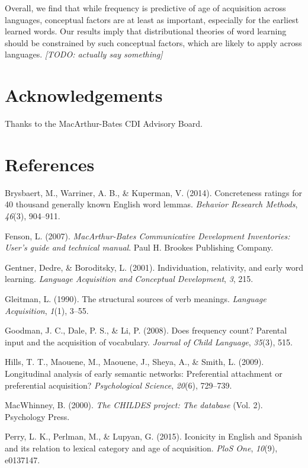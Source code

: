 \documentclass[10pt, letterpaper]{article}
\begin{document}
Overall, we find that while frequency is predictive of age of
acquisition across languages, conceptual factors are at least as
important, especially for the earliest learned words. Our results imply
that distributional theories of word learning should be constrained by
such conceptual factors, which are likely to apply across languages.
\emph{{[}TODO: actually say something{]}}

\section{Acknowledgements}\label{acknowledgements}

Thanks to the MacArthur-Bates CDI Advisory Board.

\section{References}\label{references}

\setlength{\parindent}{-0.1in} \setlength{\leftskip}{0.125in} \noindent

Brysbaert, M., Warriner, A. B., \& Kuperman, V. (2014). Concreteness
ratings for 40 thousand generally known English word lemmas.
\emph{Behavior Research Methods}, \emph{46}(3), 904--911.

Fenson, L. (2007). \emph{MacArthur-Bates Communicative Development
Inventories: User's guide and technical manual}. Paul H. Brookes
Publishing Company.

Gentner, Dedre, \& Boroditsky, L. (2001). Individuation, relativity, and
early word learning. \emph{Language Acquisition and Conceptual
Development}, \emph{3}, 215.

Gleitman, L. (1990). The structural sources of verb meanings.
\emph{Language Acquisition}, \emph{1}(1), 3--55.

Goodman, J. C., Dale, P. S., \& Li, P. (2008). Does frequency count?
Parental input and the acquisition of vocabulary. \emph{Journal of Child
Language}, \emph{35}(3), 515.

Hills, T. T., Maouene, M., Maouene, J., Sheya, A., \& Smith, L. (2009).
Longitudinal analysis of early semantic networks: Preferential
attachment or preferential acquisition? \emph{Psychological Science},
\emph{20}(6), 729--739.

MacWhinney, B. (2000). \emph{The CHILDES project: The database} (Vol.
2). Psychology Press.

Perry, L. K., Perlman, M., \& Lupyan, G. (2015). Iconicity in English
and Spanish and its relation to lexical category and age of acquisition.
\emph{PloS One}, \emph{10}(9), e0137147.
\end{document}
